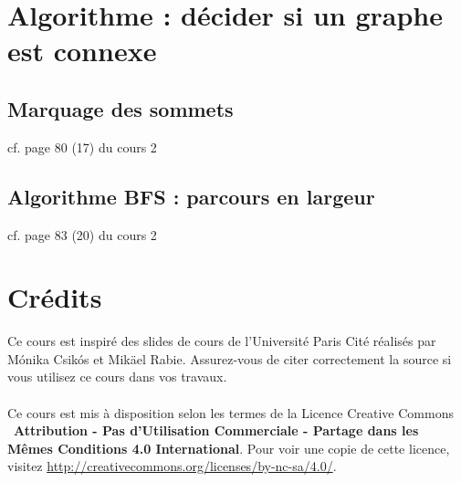 \documentclass{article}
\begin{document}

\section{Algorithme : décider si un graphe est connexe}
\subsection{Marquage des sommets}

cf. page 80 (17) du cours 2

\subsection{Algorithme BFS : parcours en largeur}

cf. page 83 (20) du cours 2

\newpage
\tableofcontents
\section*{Crédits}
Ce cours est inspiré des slides de cours de l'Université Paris Cité réalisés par Mónika Csikós et Mikäel Rabie. Assurez-vous de citer correctement la source si vous utilisez ce cours dans vos travaux.\\\\
Ce cours est mis à disposition selon les termes de la Licence Creative Commons \ccbyncsa\ \textbf{Attribution - Pas d'Utilisation Commerciale - Partage dans les Mêmes Conditions 4.0 International}. 
Pour voir une copie de cette licence, visitez \url{http://creativecommons.org/licenses/by-nc-sa/4.0/}.
\end{document}
